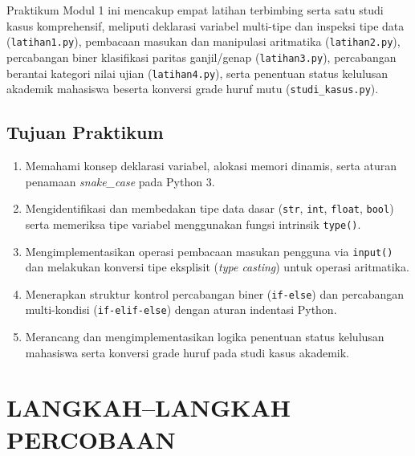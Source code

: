 \documentclass[12pt,a4paper]{article}
\begin{document}
Praktikum Modul 1 ini mencakup empat latihan terbimbing serta satu studi kasus komprehensif, meliputi deklarasi variabel multi-tipe dan inspeksi tipe data (\texttt{latihan1.py}), pembacaan masukan dan manipulasi aritmatika (\texttt{latihan2.py}), percabangan biner klasifikasi paritas ganjil/genap (\texttt{latihan3.py}), percabangan berantai kategori nilai ujian (\texttt{latihan4.py}), serta penentuan status kelulusan akademik mahasiswa beserta konversi grade huruf mutu (\texttt{studi\_kasus.py}).

\subsection{Tujuan Praktikum}
\begin{enumerate}
    \item Memahami konsep deklarasi variabel, alokasi memori dinamis, serta aturan penamaan \textit{snake\_case} pada Python 3.
    \item Mengidentifikasi dan membedakan tipe data dasar (\texttt{str}, \texttt{int}, \texttt{float}, \texttt{bool}) serta memeriksa tipe variabel menggunakan fungsi intrinsik \texttt{type()}.
    \item Mengimplementasikan operasi pembacaan masukan pengguna via \texttt{input()} dan melakukan konversi tipe eksplisit (\textit{type casting}) untuk operasi aritmatika.
    \item Menerapkan struktur kontrol percabangan biner (\texttt{if-else}) dan percabangan multi-kondisi (\texttt{if-elif-else}) dengan aturan indentasi Python.
    \item Merancang dan mengimplementasikan logika penentuan status kelulusan mahasiswa serta konversi grade huruf pada studi kasus akademik.
\end{enumerate}

\section{LANGKAH--LANGKAH PERCOBAAN}
\end{document}

